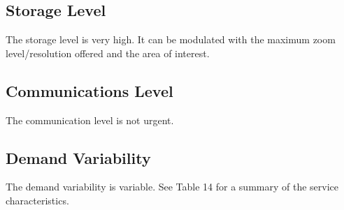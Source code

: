 \subsection{Storage Level}

The storage level is very high. It can be modulated with the maximum zoom level/resolution offered and the area of interest.
\subsection{Communications Level}
The communication level is not urgent.
\subsection{Demand Variability}
The demand variability is variable. See Table 14 for a summary of the service characteristics.